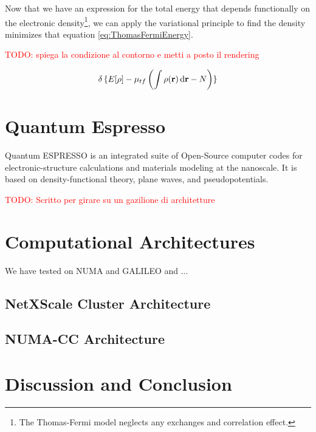 \documentclass[a4paper,12pt]{article}
\newcommand\mynotes[1]{\begin{flushright}

\textcolor{red}{TODO: #1}\end{flushright}}
\begin{document}
Now that we have an expression for the total energy that depends functionally on the electronic density\footnote{The Thomas-Fermi model neglects any exchanges and correlation effect.}, we can apply the variational principle to find the density minimizes that equation \eqref{eq:ThomasFermiEnergy}.

\mynotes{spiega la condizione al contorno e metti a posto il rendering}
\begin{equation}
	\var{} \lbrace  E[\rho] - \mu_{tf} \left( \int \rho(\mathbf{r}) \dd{\mathbf{r}} - N \right) \rbrace
\end{equation}

\section{Quantum Espresso}

Quantum ESPRESSO is an integrated suite of Open-Source computer codes for electronic-structure calculations and materials modeling at the nanoscale.
It is based on density-functional theory, plane waves, and pseudopotentials.

\mynotes{Scritto per girare su un gazilione di architetture}








\section{Computational Architectures} \label{comparch:sec}


We have tested on NUMA and GALILEO and ...


\subsection{NetXScale Cluster Architecture}\label{galileoarch:sec}
\subsection{NUMA-CC Architecture}\label{numaarch:sec}


\section{Discussion and Conclusion}
\end{document}
